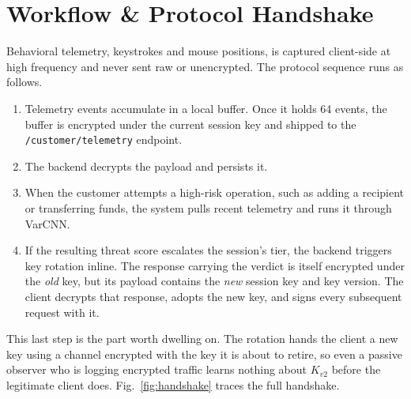 \documentclass[11pt,journal,onecolumn]{article}
\begin{document}
\section{Workflow \& Protocol Handshake}
Behavioral telemetry, keystrokes and mouse positions, is captured client-side at high frequency and never sent raw or unencrypted. The protocol sequence runs as follows.
\begin{enumerate}
    \item Telemetry events accumulate in a local buffer. Once it holds 64 events, the buffer is encrypted under the current session key and shipped to the \texttt{/customer/telemetry} endpoint.
    \item The backend decrypts the payload and persists it.
    \item When the customer attempts a high-risk operation, such as adding a recipient or transferring funds, the system pulls recent telemetry and runs it through VarCNN.
    \item If the resulting threat score escalates the session's tier, the backend triggers key rotation inline. The response carrying the verdict is itself encrypted under the \emph{old} key, but its payload contains the \emph{new} session key and key version. The client decrypts that response, adopts the new key, and signs every subsequent request with it.
\end{enumerate}

This last step is the part worth dwelling on. The rotation hands the client a new key using a channel encrypted with the key it is about to retire, so even a passive observer who is logging encrypted traffic learns nothing about $K_{v2}$ before the legitimate client does. Fig.~\ref{fig:handshake} traces the full handshake.
\end{document}
